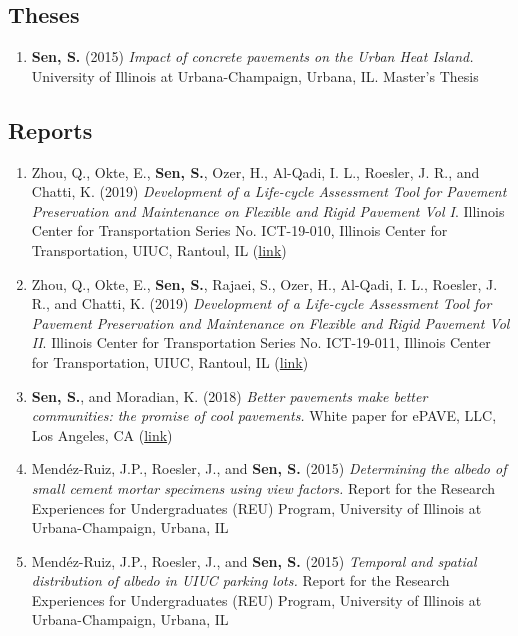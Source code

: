 \documentclass[12pt]{article}
\begin{document}
\subsection*{Theses}
\begin{enumerate}[label=(T\arabic*)]
	\item \textbf{Sen, S.} (2015) \textit{Impact of concrete pavements on the 		Urban Heat Island.} University of Illinois at Urbana-Champaign, Urbana, IL. Master’s Thesis
\end{enumerate}

\subsection*{Reports}
\begin{enumerate}[label=(R\arabic*)]
	\item Zhou, Q., Okte, E., \textbf{Sen, S.}, Ozer, H., Al-Qadi, I. L., Roesler, J. R., and Chatti, K. (2019) \textit{Development of a Life-cycle Assessment Tool for Pavement Preservation and Maintenance on Flexible and Rigid Pavement Vol I}. Illinois Center for Transportation Series No. ICT-19-010, Illinois Center for Transportation, UIUC, Rantoul, IL (\href{https://apps.ict.illinois.edu/projects/getfile.asp?id=8865}{link})
	\item Zhou, Q., Okte, E., \textbf{Sen, S.}, Rajaei, S., Ozer, H., Al-Qadi, I. L., Roesler, J. R., and Chatti, K. (2019) \textit{Development of a Life-cycle Assessment Tool for Pavement Preservation and Maintenance on Flexible and Rigid Pavement Vol II}. Illinois Center for Transportation Series No. ICT-19-011, Illinois Center for Transportation, UIUC, Rantoul, IL (\href{https://apps.ict.illinois.edu/projects/getfile.asp?id=8866}{link})
	\item \textbf{Sen, S.}, and Moradian, K. (2018) \textit{Better pavements make better communities: the promise of cool pavements.} White paper for ePAVE, LLC, Los Angeles, CA (\href{http://www.epavellc.com/wp-content/uploads/ePAVE-White-Paper.pdf}{link})
	\item Mend\'ez-Ruiz, J.P., Roesler, J., and \textbf{Sen, S.} (2015) \textit{Determining the albedo of small cement mortar specimens using view factors.} Report for the Research Experiences for Undergraduates (REU) Program, University of Illinois at Urbana-Champaign, Urbana, IL
	\item Mend\'ez-Ruiz, J.P., Roesler, J., and \textbf{Sen, S.} (2015) \textit{Temporal and spatial distribution of albedo in UIUC parking lots.} Report for the Research Experiences for Undergraduates (REU) Program, University of Illinois at Urbana-Champaign, Urbana, IL
	
\end{enumerate}
\end{document}
